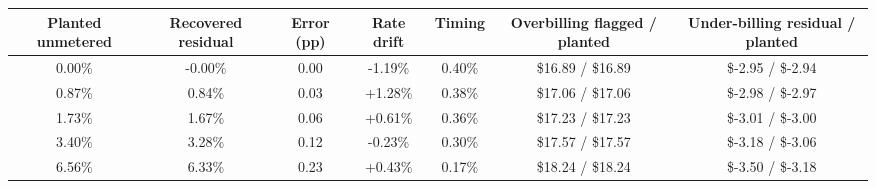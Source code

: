 \begin{tabular}{@{}ccccccc@{}}
\toprule
Planted unmetered & Recovered residual & Error (pp) & Rate drift & Timing & Overbilling flagged / planted & Under-billing residual / planted \\
\midrule
0.00\% & -0.00\% & 0.00 & -1.19\% & 0.40\% & \$16.89 / \$16.89 & \$-2.95 / \$-2.94 \\
0.87\% & 0.84\% & 0.03 & +1.28\% & 0.38\% & \$17.06 / \$17.06 & \$-2.98 / \$-2.97 \\
1.73\% & 1.67\% & 0.06 & +0.61\% & 0.36\% & \$17.23 / \$17.23 & \$-3.01 / \$-3.00 \\
3.40\% & 3.28\% & 0.12 & -0.23\% & 0.30\% & \$17.57 / \$17.57 & \$-3.18 / \$-3.06 \\
6.56\% & 6.33\% & 0.23 & +0.43\% & 0.17\% & \$18.24 / \$18.24 & \$-3.50 / \$-3.18 \\
\bottomrule
\end{tabular}

